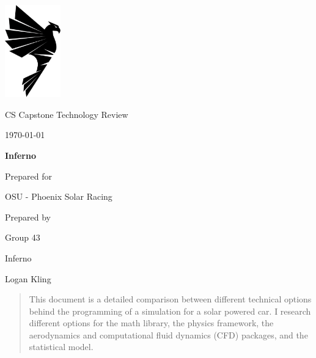 \documentclass[onecolumn, draftclsnofoot,10pt, compsoc]{IEEEtran}
\def \CapstoneTeamName{		Inferno}
\def \CapstoneTeamNumber{		43}
\def \GroupMemberOne{			Dennie Devito}
\def \GroupMemberTwo{			Logan Kling}
\def \GroupMemberThree{			Dakota Zaengle}
\def \CapstoneProjectName{		Inferno}
\def \CapstoneSponsorCompany{	OSU - Phoenix Solar Racing}
\def \CapstoneSponsorPerson{		Cailin Moore}
\def \DocType{		%
				Technology Review
				}
\newcommand{\NameSigPair}[1]{\par
\makebox[2.75in][r]{#1} \hfil 	\makebox[3.25in]{\makebox[2.25in]{\hrulefill} \hfill		\makebox[.75in]{\hrulefill}}
\par\vspace{-12pt} \textit{\tiny\noindent
\makebox[2.75in]{} \hfil		\makebox[3.25in]{\makebox[2.25in][r]{Signature} \hfill	\makebox[.75in][r]{Date}}}}
\begin{document}
\begin{singlespace}
\begin{titlepage}
    	\includegraphics[height=4cm]{Shirt_Graphic}
        \hfill 
        \par\vspace{.2in}
        \centering
        \scshape{
            \huge CS Capstone \DocType \par
            {\large\today}\par
            \vspace{.5in}
            \textbf{\Huge\CapstoneProjectName}\par
            \vfill
            {\large Prepared for}\par
            \Huge \CapstoneSponsorCompany\par
            \vspace{5pt}
            {\large Prepared by }\par
            Group\CapstoneTeamNumber\par
            \CapstoneTeamName\par 
            \vspace{5pt}
            {\Large
                Logan Kling%
            }
            \vspace{20pt}
        }
        \begin{abstract}
        	This document is a detailed comparison between different technical options behind the programming of a simulation for a solar powered car.
	I research different options for the math library, the physics framework, the aerodynamics and computational fluid dynamics (CFD) packages, and the statistical model.

\end{abstract}
\end{titlepage}
\end{singlespace}
\end{document}
